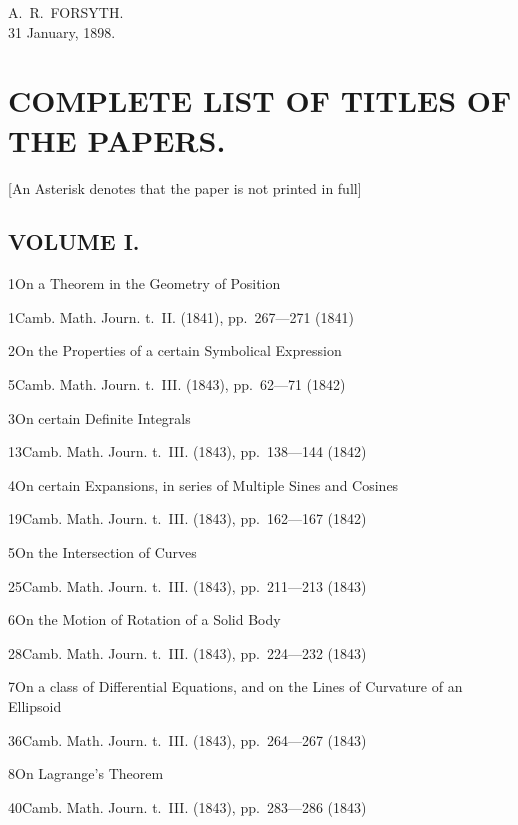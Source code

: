 \documentclass[11pt,a4paper]{book}
\providecommand{\tocentry}[2]{#1\dotfill #2\par}
\begin{document}
\begin{flushright}
A.~R.~FORSYTH.\\
31 January, 1898.
\end{flushright}

\newpage

\section*{COMPLETE LIST OF TITLES OF THE PAPERS.}

\begin{center}
[An Asterisk denotes that the paper is not printed in full]
\end{center}

\newpage

\subsection*{VOLUME I.}

\tocentry{1}{On a Theorem in the Geometry of Position}{1}{Camb. Math. Journ. t.~II. (1841), pp.~267---271 (1841)}

\tocentry{2}{On the Properties of a certain Symbolical Expression}{5}{Camb. Math. Journ. t.~III. (1843), pp.~62---71 (1842)}

\tocentry{3}{On certain Definite Integrals}{13}{Camb. Math. Journ. t.~III. (1843), pp.~138---144 (1842)}

\tocentry{4}{On certain Expansions, in series of Multiple Sines and Cosines}{19}{Camb. Math. Journ. t.~III. (1843), pp.~162---167 (1842)}

\tocentry{5}{On the Intersection of Curves}{25}{Camb. Math. Journ. t.~III. (1843), pp.~211---213 (1843)}

\tocentry{6}{On the Motion of Rotation of a Solid Body}{28}{Camb. Math. Journ. t.~III. (1843), pp.~224---232 (1843)}

\tocentry{7}{On a class of Differential Equations, and on the Lines of Curvature of an Ellipsoid}{36}{Camb. Math. Journ. t.~III. (1843), pp.~264---267 (1843)}

\tocentry{8}{On Lagrange's Theorem}{40}{Camb. Math. Journ. t.~III. (1843), pp.~283---286 (1843)}
\end{document}
